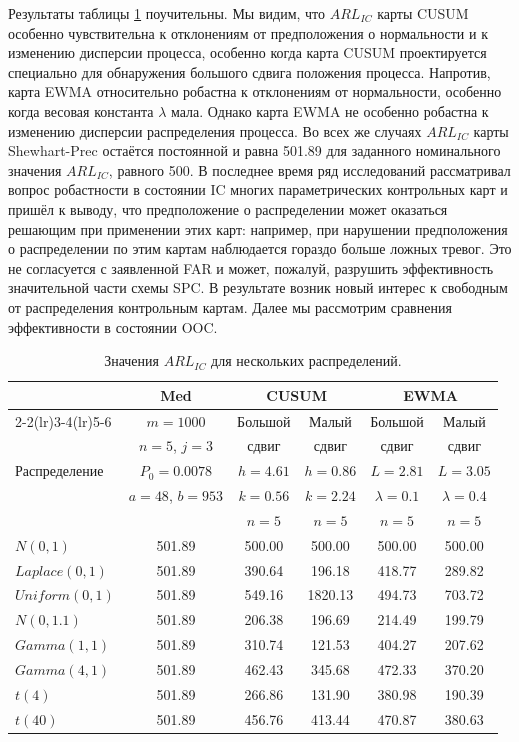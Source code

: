 Результаты таблицы \ref{tab:4.19} поучительны. Мы видим, что \(ARL_{IC}\) карты CUSUM особенно чувствительна к отклонениям от предположения о нормальности и к изменению дисперсии процесса, особенно когда карта CUSUM проектируется специально для обнаружения большого сдвига положения процесса. Напротив, карта EWMA относительно робастна к отклонениям от нормальности, особенно когда весовая константа \(\lambda\) мала. Однако карта EWMA не особенно робастна к изменению дисперсии распределения процесса. Во всех же случаях \(ARL_{IC}\) карты Shewhart-Prec остаётся постоянной и равна 501.89 для заданного номинального значения \(ARL_{IC}\), равного 500. В последнее время ряд исследований рассматривал вопрос робастности в состоянии IC многих параметрических контрольных карт и пришёл к выводу, что предположение о распределении может оказаться решающим при применении этих карт: например, при нарушении предположения о распределении по этим картам наблюдается гораздо больше ложных тревог. Это не согласуется с заявленной FAR и может, пожалуй, разрушить эффективность значительной части схемы SPC. В результате возник новый интерес к свободным от распределения контрольным картам. Далее мы рассмотрим сравнения эффективности в состоянии OOC.

\begin{table}[!ht]
	\centering
	\caption{Значения \(ARL_{IC}\) для нескольких распределений.}
	\label{tab:4.19}
	\small
	\begin{tabular}{@{}lccccc@{}}
		\toprule
		& Med & \multicolumn{2}{c}{CUSUM} & \multicolumn{2}{c}{EWMA} \\
		\cmidrule(lr){2-2}\cmidrule(lr){3-4}\cmidrule(lr){5-6}
		& \(m = 1000\) & Большой & Малый & Большой & Малый \\
		& \(n = 5\), \(j = 3\) & сдвиг & сдвиг & сдвиг & сдвиг \\
		Распределение & \(P_0 = 0.0078\) & \(h = 4.61\) & \(h = 0.86\) & \(L = 2.81\) & \(L = 3.05\) \\
		& \(a = 48\), \(b = 953\) & \(k = 0.56\) & \(k = 2.24\) & \(\lambda = 0.1\) & \(\lambda = 0.4\) \\
		& & \(n = 5\) & \(n = 5\) & \(n = 5\) & \(n = 5\) \\
		\midrule
		\(N(0, 1)\) & 501.89 & 500.00 & 500.00 & 500.00 & 500.00 \\
		\(Laplace(0, 1)\) & 501.89 & 390.64 & 196.18 & 418.77 & 289.82 \\
		\(Uniform(0, 1)\) & 501.89 & 549.16 & 1820.13 & 494.73 & 703.72 \\
		\(N(0, 1.1)\) & 501.89 & 206.38 & 196.69 & 214.49 & 199.79 \\
		\(Gamma(1, 1)\) & 501.89 & 310.74 & 121.53 & 404.27 & 207.62 \\
		\(Gamma(4, 1)\) & 501.89 & 462.43 & 345.68 & 472.33 & 370.20 \\
		\(t(4)\) & 501.89 & 266.86 & 131.90 & 380.98 & 190.39 \\
		\(t(40)\) & 501.89 & 456.76 & 413.44 & 470.87 & 380.63 \\
		\bottomrule
	\end{tabular}
\end{table}

